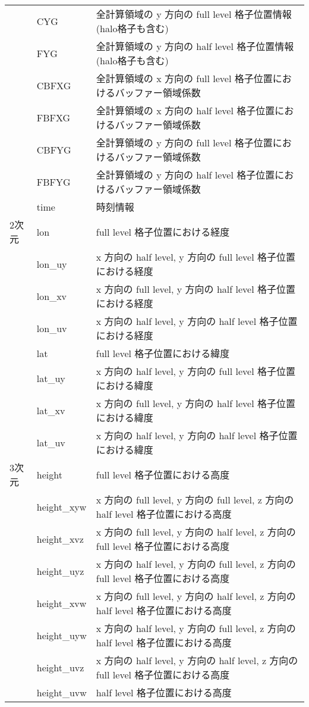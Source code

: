 \begin{longtable}{|l|ll|}
    & CYG & 全計算領域の y 方向の full level 格子位置情報 (halo格子も含む) \\
    & FYG & 全計算領域の y 方向の half level 格子位置情報 (halo格子も含む) \\
    & CBFXG & 全計算領域の x 方向の full level 格子位置におけるバッファー領域係数 \\
    & FBFXG & 全計算領域の x 方向の half level 格子位置におけるバッファー領域係数 \\
    & CBFYG & 全計算領域の y 方向の full level 格子位置におけるバッファー領域係数 \\
    & FBFYG & 全計算領域の y 方向の half level 格子位置におけるバッファー領域係数 \\
    & time & 時刻情報 \\
    \hline
    2次元
    & lon & full level 格子位置における経度 \\
    & lon\_uy & x 方向の half level, y 方向の full level 格子位置における経度 \\
    & lon\_xv & x 方向の full level, y 方向の half level 格子位置における経度 \\
    & lon\_uv & x 方向の half level, y 方向の half level 格子位置における経度 \\
    & lat & full level 格子位置における緯度 \\
    & lat\_uy & x 方向の half level, y 方向の full level 格子位置における緯度 \\
    & lat\_xv & x 方向の full level, y 方向の half level 格子位置における緯度 \\
    & lat\_uv & x 方向の half level, y 方向の half level 格子位置における緯度 \\
    \hline
    3次元
    & height & full level 格子位置における高度 \\
    & height\_xyw & x 方向の full level, y 方向の full level, z 方向の half level 格子位置における高度 \\
    & height\_xvz & x 方向の full level, y 方向の half level, z 方向の full level 格子位置における高度 \\
    & height\_uyz & x 方向の half level, y 方向の full level, z 方向の full level 格子位置における高度 \\
    & height\_xvw & x 方向の full level, y 方向の half level, z 方向の half level 格子位置における高度 \\
    & height\_uyw & x 方向の half level, y 方向の full level, z 方向の half level 格子位置における高度 \\
    & height\_uvz & x 方向の half level, y 方向の half level, z 方向の full level 格子位置における高度 \\
    & height\_uvw & half level 格子位置における高度 \\
\end{longtable}

